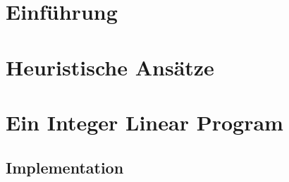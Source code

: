 
\label{ch:Content1}

\section{Einführung}



\section{Heuristische Ansätze}



\section{Ein Integer Linear Program}



\subsection{Implementation}


